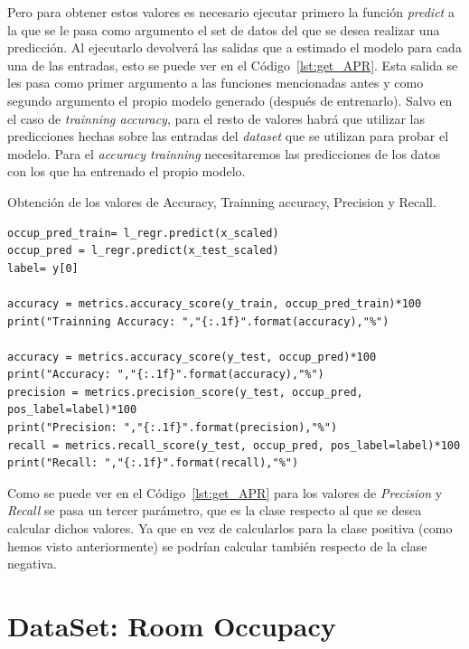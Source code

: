 \documentclass[a4paper, 12pt]{book}
\begin{document}
Pero para obtener estos valores es necesario ejecutar primero la función \textit{predict} a la que se le pasa como argumento el set de datos del que se desea realizar una predicción. Al ejecutarlo devolverá las salidas que a estimado el modelo para cada una de las entradas, esto se puede ver en el Código~\ref{lst:get_APR}. Esta salida se les pasa como primer argumento a las funciones mencionadas antes y como segundo argumento el propio modelo generado (después de entrenarlo). Salvo en el caso de \textit{trainning accuracy}, para el resto de valores habrá que utilizar las predicciones hechas sobre las entradas del \textit{dataset} que se utilizan para probar el modelo. Para el \textit{accuracy trainning} necesitaremos las predicciones de los datos con los que ha entrenado el propio modelo.

\begin{listing}[]
    \caption{Obtención de los valores de Accuracy, Trainning accuracy, Precision y Recall.}{}
    \label{lst:get_APR}
    \begin{verbatim}
occup_pred_train= l_regr.predict(x_scaled)
occup_pred = l_regr.predict(x_test_scaled)    
label= y[0]

accuracy = metrics.accuracy_score(y_train, occup_pred_train)*100
print("Trainning Accuracy: ","{:.1f}".format(accuracy),"%")

accuracy = metrics.accuracy_score(y_test, occup_pred)*100
print("Accuracy: ","{:.1f}".format(accuracy),"%")
precision = metrics.precision_score(y_test, occup_pred, pos_label=label)*100
print("Precision: ","{:.1f}".format(precision),"%")
recall = metrics.recall_score(y_test, occup_pred, pos_label=label)*100
print("Recall: ","{:.1f}".format(recall),"%")
    \end{verbatim}
\end{listing}

Como se puede ver en el Código~\ref{lst:get_APR} para los valores de \textit{Precision} y \textit{Recall} se pasa un tercer parámetro, que es la clase respecto al que se desea calcular dichos valores. Ya que en vez de calcularlos para la clase positiva (como hemos visto anteriormente) se podrían calcular también respecto de la clase negativa.

\section{DataSet: Room Occupacy}
\label{sec:dataSet_Occupancy}
\end{document}
